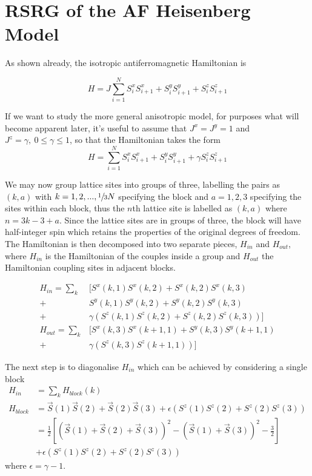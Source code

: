 \documentclass[../rsrg.tex,../../main.tex]{subfiles}
\begin{document}
\section{RSRG of the AF Heisenberg Model}

As shown already, the isotropic antiferromagnetic Hamiltonian is

\begin{equation}
    H=J\sum_{i=1}^{N} S_{i}^{x}S_{i+1}^{x}+S_{i}^{y}S_{i+1}^{y}+S_{i}^{z}S_{i+1}^{z}
\end{equation}


If we want to study the more general anisotropic model, for purposes what will become apparent later, it's useful to assume that $J^{x}=J^{y}=1$ and $J^{z}=\gamma,\ 0\le\gamma\le1$, so that the Hamiltonian takes the form
\begin{equation}
    H=\sum_{i=1}^{N} S_{i}^{x}S_{i+1}^{x}+S_{i}^{y}S_{i+1}^{y}+\gamma S_{i}^{z}S_{i+1}^{z}
\end{equation}

We may now group lattice sites into groups of three, labelling the pairs as $(k,a)$ with $k=1,2,...,\sfrac{1}{3}N$ specifying the block and $a=1,2,3$ specifying the sites within each block, thus the $n$th lattice site is labelled as $(k,a)$ where $n=3k-3+a$. Since the lattice sites are in groups of three, the block will have half-integer spin which retains the properties of the original degrees of freedom. The Hamiltonian is then decomposed into two separate pieces, $H_{in}$ and $H_{out}$, where $H_{in}$ is the Hamiltonian of the couples inside a group and $H_{out}$ the Hamiltonian coupling sites in adjacent blocks.

\begin{equation}
    \begin{split}
        H_{in}=\sum_{k}&\Big[S^{x}(k,1)S^{x}(k,2)+S^{x}(k,2)S^{x}(k,3)\\
                +&S^{y}(k,1)S^{y}(k,2)+S^{y}(k,2)S^{y}(k,3)\\
                +&\gamma(S^{z}(k,1)S^{z}(k,2)+S^{z}(k,2)S^{z}(k,3))\Big]\\
    H_{out}=\sum_{k}&\Big[S^{x}(k,3)S^{x}(k+1,1)+S^{y}(k,3)S^{y}(k+1,1)\\
        +&\gamma(S^{z}(k,3)S^{z}(k+1,1)) \Big]
    \end{split}
\end{equation}

The next step is to diagonalise $H_{in}$ which can be achieved by considering a single block
\begin{equation}
\begin{split}
    H_{in}&=\sum_{k}H_{block}(k)\\
    H_{block}&=\vec{S}(1)\vec{S}(2)+\vec{S}(2)\vec{S}(3) + \epsilon (S^{z}(1)S^{z}(2)+S^{z}(2)S^{z}(3))\\
            &=\frac{1}{2}\left[(\vec{S}(1)+\vec{S}(2)+\vec{S}(3))^{2}-(\vec{S}(1)+\vec{S}(3))^{2}-\frac{3}{2}\right]\\
            &+\epsilon(S^{z}(1)S^{z}(2)+S^{z}(2)S^{z}(3))
\end{split}
\end{equation}
where $\epsilon=\gamma-1$.\\
\end{document}
